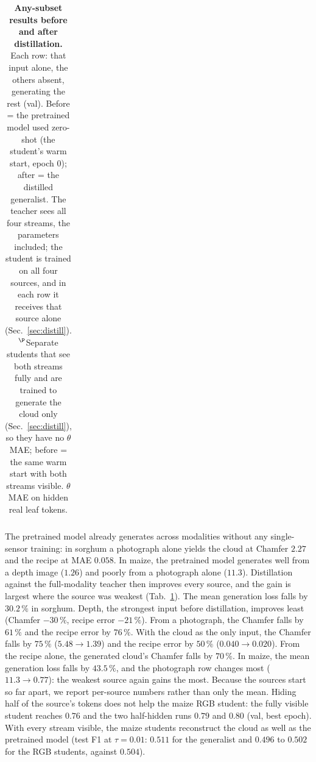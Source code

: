 \begin{table}[t]
\begin{tabular}{l cc cc c cc cc}
    \bottomrule
  \end{tabular}
  \caption{\textbf{Any-subset results before and after distillation.} Each row:
  that input alone, the others absent, generating the rest (val). Before = the
  pretrained model used zero-shot (the student's warm start, epoch 0); after =
  the distilled generalist. The teacher sees all four streams, the parameters
  included; the student is trained on all four sources, and in each row it
  receives that source alone (Sec.~\ref{sec:distill}). $^\P$Separate students
  that see both streams fully and are trained to generate the cloud only
  (Sec.~\ref{sec:distill}), so they have no $\theta$ MAE; before = the same
  warm start with both streams visible. $\theta$ MAE on
  hidden real leaf tokens.}
  \label{tab:anysubset}
\end{table}

The pretrained model already generates across modalities without any
single-sensor training: in sorghum a photograph alone yields the cloud at
Chamfer $2.27$ and the recipe at MAE $0.058$. In maize, the pretrained model
generates well from a depth image ($1.26$) and poorly from a photograph alone
($11.3$). Distillation against the full-modality teacher then improves every source,
and the gain is largest where the source was weakest
(Tab.~\ref{tab:anysubset}). The mean generation loss falls by $30.2\,\%$ in
sorghum. Depth, the strongest input before distillation, improves least
(Chamfer $-30\,\%$, recipe error $-21\,\%$). From a photograph, the Chamfer
falls by $61\,\%$ and the recipe error by $76\,\%$. With the cloud as the
only input, the Chamfer falls by $75\,\%$ ($5.48 \to 1.39$) and the recipe
error by $50\,\%$ ($0.040 \to 0.020$). From the recipe alone, the generated
cloud's Chamfer falls by $70\,\%$. In maize, the mean generation loss falls by $43.5\,\%$, and the photograph row
changes most ($11.3 \to 0.77$): the weakest source again gains the most. Because
the sources start so far apart, we report per-source numbers rather than only
the mean. Hiding half of the source's tokens does not help the maize RGB
student: the fully visible student reaches $0.76$ and the two half-hidden runs
$0.79$ and $0.80$ (val, best epoch). With every stream visible, the maize
students reconstruct the cloud as well as the pretrained model (test F1 at
$\tau{=}0.01$: $0.511$ for the generalist and $0.496$ to $0.502$ for the RGB
students, against $0.504$).

